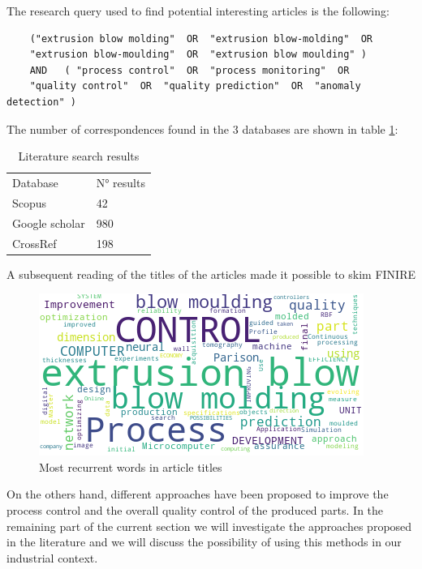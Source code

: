 The research query used to find potential interesting articles is the following:

\begin{verbatim}
    ("extrusion blow molding"  OR  "extrusion blow-molding"  OR
    "extrusion blow-moulding"  OR  "extrusion blow moulding" )  
    AND   ( "process control"  OR  "process monitoring"  OR
    "quality control"  OR  "quality prediction"  OR  "anomaly detection" )
\end{verbatim}

The number of correspondences found in the 3 databases are shown in table \ref{tab:literature_search_results}:

\begin{table}[]
\centering
\begin{tabular}{ll}
Database       & N° results \\
Scopus         & 42        \\
Google scholar & 980        \\
CrossRef       & 198       
\end{tabular}
\caption{Literature search results}
\label{tab:literature_search_results}
\end{table}

A subsequent reading of the titles of the articles made it possible to skim FINIRE

\begin{figure}
\centerline{\includegraphics[scale=1]{images/chapter_2/wordcloud.png}}
\caption{Most recurrent words in article titles}
\label{fig:wordcloud}
\end{figure}

On the others hand, different approaches have been proposed to improve the process control and the overall quality control of the produced parts. In the remaining part of the current section we will investigate the approaches proposed in the literature and we will discuss the possibility of using this methods in our industrial context.  

